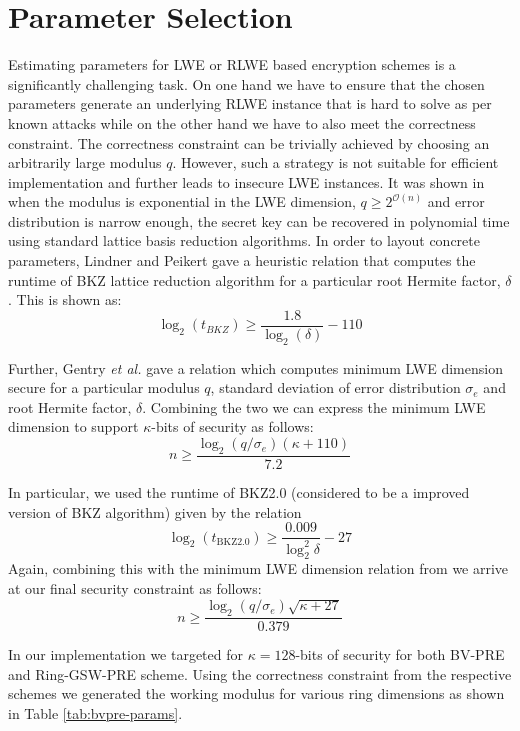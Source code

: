 \section{Parameter Selection} \label{paramSelect}

Estimating parameters for LWE or RLWE based encryption schemes is a significantly challenging task. On one hand we have to ensure that the chosen parameters generate an underlying RLWE instance that is hard to solve as per known attacks while on the other hand we have to also meet the correctness constraint. The correctness constraint can be trivially achieved by choosing an arbitrarily large modulus $q$. However, such a strategy is not suitable for efficient implementation and further leads to insecure LWE instances. It was shown in \cite{laine2015key} when the modulus is exponential in the LWE dimension, $q \geq 2^{\mathcal{O}(n)}$ and error distribution is narrow enough, the secret key can be recovered in polynomial time using standard lattice basis reduction algorithms. In order to layout concrete parameters, Lindner and Peikert \cite{lindner2011better} gave a heuristic relation that computes the runtime of BKZ lattice reduction algorithm for a particular root Hermite factor, $\delta$. This is shown as: $$\log_2{\left(t_{BKZ} \right)} \geq \frac{1.8}{\log_2(\delta)} - 110$$ 

Further, Gentry \textit{et al.} \cite{gentry2012homomorphic} gave a relation which computes minimum LWE dimension secure for a particular modulus $q$, standard deviation of error distribution $\sigma_e$ and root Hermite factor, $\delta$. Combining the two we can express the minimum LWE dimension to support $\kappa$-bits of security as follows:
$$n \geq \frac{\log_2{\left( q/\sigma_e \right)} \left(\kappa + 110 \right)}{7.2}$$

In particular, we used the runtime of BKZ2.0 \cite{albrecht2015complexity} (considered to be a improved version of BKZ algorithm) given by the relation $$\log_2{\left(t_{\text{BKZ2.0}} \right)} \geq \frac{0.009}{\log_2^2{\delta}} - 27 $$ Again, combining this with the minimum LWE dimension relation from \cite{gentry2012homomorphic} we arrive at our final security constraint as follows:
$$n \geq \frac{ \log_2{\left( q/\sigma_e \right)} \sqrt{\kappa + 27} } {0.379} $$  

In our implementation we targeted for $\kappa = 128$-bits of security for both BV-PRE and Ring-GSW-PRE scheme. Using the correctness constraint from the respective schemes we generated the working modulus for various ring dimensions as shown in Table \ref{tab:bvpre-params}.

